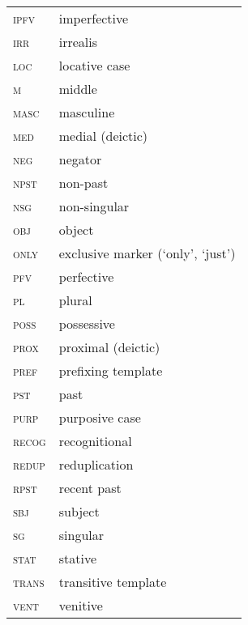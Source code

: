 \documentclass[output=paper]{langscibook}
\begin{document}
		\begin{tabularx}{.45\textwidth}{lQ}
		\textsc{ipfv} & {imperfective}\\
		\textsc{irr} & {irrealis}\\
		\textsc{loc} & {locative case}\\
		\textsc{m} & {middle}\\
		\textsc{masc} & {masculine}\\
		\textsc{med} & {medial (deictic)}\\
		\textsc{neg} & {negator}\\
		\textsc{npst} & {non-past}\\
		\textsc{nsg} & {non-singular}\\
		\textsc{obj} & {object}\\
		\textsc{only} & {exclusive marker (`only', `just')}\\
		\textsc{pfv} & {perfective}\\
		\textsc{pl} & {plural}\\
		\textsc{poss} & {possessive}\\
		\textsc{prox} & {proximal (deictic)}\\
		\textsc{pref} & {prefixing template}\\
		\textsc{pst} & {past}\\
		\textsc{purp} & {purposive case}\\
		\textsc{recog} & {recognitional}\\
		\textsc{redup} & {reduplication}\\
		\textsc{rpst} & {recent past}\\
		\textsc{sbj} & {subject}\\
		\textsc{sg} & {singular}\\
		\textsc{stat} & {stative}\\
		\textsc{trans} & {transitive template}\\
		\textsc{vent} & {venitive}\\
\end{tabularx}
\end{document}
